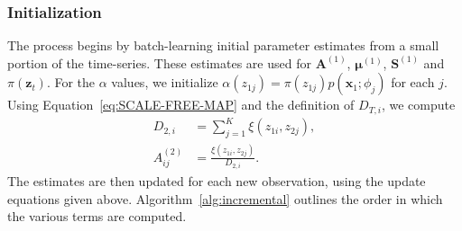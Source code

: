 \documentclass[letterpaper]{article}
\makeatletter
\def\BState{\State\hskip-\ALG@thistlm}
\makeatother
\begin{document}
\subsubsection{Initialization}

The process begins by batch-learning initial parameter estimates from a small portion of the time-series. These estimates are used for $\mathbf{A}^{(1)}$, $\mathbf{\mu}^{(1)}$, $\mathbf{S}^{(1)}$ and $\pi(\mathbf{z}_t)$. For the $\alpha$ values, we initialize $\alpha(z_{1j}) = \pi(z_{1j})p(\mathbf{x}_1; \phi_j)$ for each $j$. Using Equation~\ref{eq:SCALE-FREE-MAP} and the definition of $D_{T,i}$, we compute
\begin{align*}
    D_{2,i} &= \sum_{j=1}^{K} \xi(z_{1i}, z_{2j}), \\
    A_{ij}^{(2)} &= \frac{\xi(z_{1i}, z_{2j})}{D_{2,i}}.
\end{align*}
The estimates are then updated for each new observation, using the update equations given above. Algorithm~\ref{alg:incremental} outlines the order in which the various terms are computed.

\begin{algorithm}
\caption{}
\label{alg:incremental}
\end{algorithm}

%
%
\end{document}
